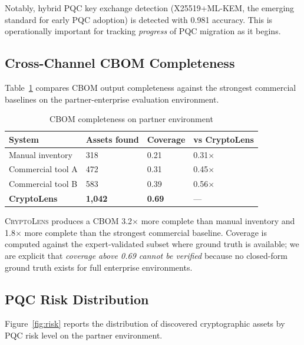 \documentclass[sigconf,nonacm]{acmart}
\begin{document}
Notably, hybrid PQC key exchange detection (X25519+ML-KEM, the
emerging standard for early PQC adoption) is detected with
0.981 accuracy. This is operationally important for tracking
\emph{progress} of PQC migration as it begins.

\subsection{Cross-Channel CBOM Completeness}

Table~\ref{tab:completeness} compares CBOM output completeness
against the strongest commercial baselines on the partner-enterprise
evaluation environment.

\begin{table}[h]
\caption{CBOM completeness on partner environment}
\label{tab:completeness}
\small
\begin{tabularx}{\columnwidth}{@{}p{2.6cm}X X X@{}}
\toprule
\textbf{System} & \textbf{Assets found} & \textbf{Coverage} & \textbf{vs CryptoLens} \\
\midrule
Manual inventory       & 318   & 0.21 & 0.31$\times$ \\
Commercial tool A      & 472   & 0.31 & 0.45$\times$ \\
Commercial tool B      & 583   & 0.39 & 0.56$\times$ \\
\textbf{CryptoLens}    & \textbf{1{,}042} & \textbf{0.69} & --- \\
\bottomrule
\end{tabularx}
\end{table}

\textsc{CryptoLens} produces a CBOM 3.2$\times$ more complete than
manual inventory and 1.8$\times$ more complete than the strongest
commercial baseline. Coverage is computed against the
expert-validated subset where ground truth is available; we are
explicit that \emph{coverage above 0.69 cannot be verified} because
no closed-form ground truth exists for full enterprise environments.

\subsection{PQC Risk Distribution}

Figure~\ref{fig:risk} reports the distribution of discovered
cryptographic assets by PQC risk level on the partner environment.
\end{document}
